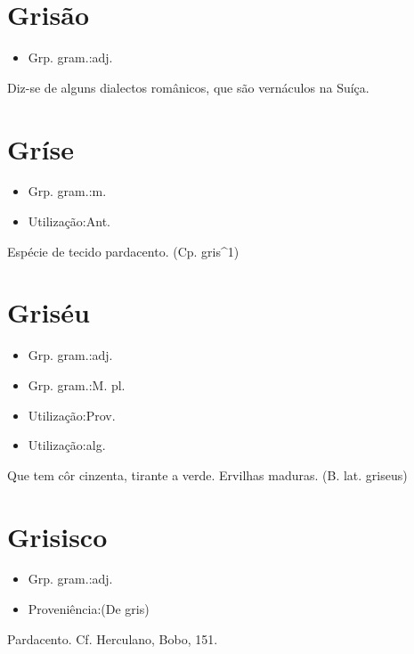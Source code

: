 \section{Grisão}
\begin{itemize}
\item {Grp. gram.:adj.}
\end{itemize}
Diz-se de alguns dialectos românicos, que são vernáculos na Suíça.
\section{Gríse}
\begin{itemize}
\item {Grp. gram.:m.}
\end{itemize}
\begin{itemize}
\item {Utilização:Ant.}
\end{itemize}
Espécie de tecido pardacento.
(Cp. \textunderscore gris\textunderscore ^1)
\section{Griséu}
\begin{itemize}
\item {Grp. gram.:adj.}
\end{itemize}
\begin{itemize}
\item {Grp. gram.:M. pl.}
\end{itemize}
\begin{itemize}
\item {Utilização:Prov.}
\end{itemize}
\begin{itemize}
\item {Utilização:alg.}
\end{itemize}
Que tem côr cinzenta, tirante a verde.
Ervilhas maduras.
(B. lat. \textunderscore griseus\textunderscore )
\section{Grisisco}
\begin{itemize}
\item {Grp. gram.:adj.}
\end{itemize}
\begin{itemize}
\item {Proveniência:(De \textunderscore gris\textunderscore )}
\end{itemize}
Pardacento. Cf. Herculano, \textunderscore Bobo\textunderscore , 151.
